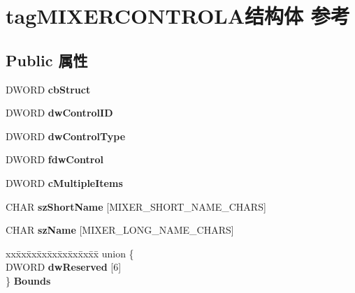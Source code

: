 \hypertarget{structtag_m_i_x_e_r_c_o_n_t_r_o_l_a}{}\section{tag\+M\+I\+X\+E\+R\+C\+O\+N\+T\+R\+O\+L\+A结构体 参考}
\label{structtag_m_i_x_e_r_c_o_n_t_r_o_l_a}
\subsection*{Public 属性}
\begin{DoxyCompactItemize}
\item 
\mbox{\label{structtag_m_i_x_e_r_c_o_n_t_r_o_l_a_a9ddd20fc1b1a0604521fde79dcde4d1f}} 
D\+W\+O\+RD {\bfseries cb\+Struct}
\item 
\mbox{\label{structtag_m_i_x_e_r_c_o_n_t_r_o_l_a_abe0d0be49906e0442f4250e60df48cc6}} 
D\+W\+O\+RD {\bfseries dw\+Control\+ID}
\item 
\mbox{\label{structtag_m_i_x_e_r_c_o_n_t_r_o_l_a_ac7c45b92fc5015a24c2606332ec5589d}} 
D\+W\+O\+RD {\bfseries dw\+Control\+Type}
\item 
\mbox{\label{structtag_m_i_x_e_r_c_o_n_t_r_o_l_a_a4cd981836b9a2dff1bb1bb954d65d1fe}} 
D\+W\+O\+RD {\bfseries fdw\+Control}
\item 
\mbox{\label{structtag_m_i_x_e_r_c_o_n_t_r_o_l_a_ae0a996e9313b75bd52e37e1fc5ae7641}} 
D\+W\+O\+RD {\bfseries c\+Multiple\+Items}
\item 
\mbox{\label{structtag_m_i_x_e_r_c_o_n_t_r_o_l_a_ac3f326331474d5d18565d26836995be4}} 
C\+H\+AR {\bfseries sz\+Short\+Name} \mbox{[}M\+I\+X\+E\+R\+\_\+\+S\+H\+O\+R\+T\+\_\+\+N\+A\+M\+E\+\_\+\+C\+H\+A\+RS\mbox{]}
\item 
\mbox{\label{structtag_m_i_x_e_r_c_o_n_t_r_o_l_a_a9e7cb50c685432009f4055679f14e76f}} 
C\+H\+AR {\bfseries sz\+Name} \mbox{[}M\+I\+X\+E\+R\+\_\+\+L\+O\+N\+G\+\_\+\+N\+A\+M\+E\+\_\+\+C\+H\+A\+RS\mbox{]}
\item 
\mbox{\label{structtag_m_i_x_e_r_c_o_n_t_r_o_l_a_aa5bea1b3f0654033d5ddc500ceae33ac}} 
\begin{tabbing}
xx\=xx\=xx\=xx\=xx\=xx\=xx\=xx\=xx\=\kill
union \{\\
\>DWORD {\bfseries dwReserved} \mbox{[}6\mbox{]}\\
\} {\bfseries Bounds}\\


\end{tabbing}
\end{DoxyCompactItemize}
